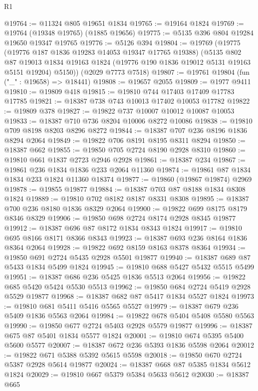 \begin{lexlean}{R1}
\begin{coremodule}
@19764 := @11324 @805 @19651 @1834
@19765 := @19164 @1824
@19769 := @19764 (@19348 @19765) (@1885 @19656)
@19775 := @5135 @396 @804 @19284 @19650 @19347 @19765
@19776 := @5126 @394
@19804 := @19769
    (@19775
      (@19776 @187 @1836 @19283 @14053 @19347 @17765 @19388)
      (@5135
        @802
        @87
        @19013
        @1834
        @19163
        @1824
        (@19776 @190 @1836 @19012 @5131 @19163 @5151 @19204)
        @5150))
    (@2029 @7773 @7518)
@19807 := @19761 @19804 (fun ("_" : @19658) => @18441)
@19808 := @19657 @2055
@19809 := @1977 @9411
@19810 := @19809 @418
@19815 := @19810 @744 @17403 @17409 @17783 @17785
@19821 := @18387 @738 @743 @10013 @17402 @10053 @17782
@19822 := @19809 @378
@19827 := @19822 @737 @10007 @10012 @10087 @10053
@19833 := @18387 @710 @736 @8204 @10006 @8272 @10086
@19838 := @19810 @709 @8198 @8203 @8296 @8272
@19844 := @18387 @707 @236 @8196 @1836 @8294 @2064
@19849 := @19822 @706 @8191 @8195 @8311 @8294
@19850 := @18387 @662
@19855 := @19850 @705 @2724 @8190 @2928 @8310
@19860 := @19810 @661 @1837 @2723 @2946 @2928
@19861 := @18387 @234
@19867 := @19861 @236 @1834 @1836 @233 @2064 @11360
@19874 := @19861 @87 @1834 @1834 @233 @1824 @11360 @18374
@19877 := @19860 (@19867 @19874) @2969
@19878 := @19855 @19877
@19884 := @18387 @703 @87 @8188 @1834 @8308 @1824
@19889 := @19810 @702 @8182 @8187 @8331 @8308
@19895 := @18387 @700 @236 @8180 @1836 @8329 @2064
@19900 := @19822 @699 @8175 @8179 @8346 @8329
@19906 := @19850 @698 @2724 @8174 @2928 @8345 @19877
@19912 := @18387 @696 @87 @8172 @1834 @8343 @1824
@19917 := @19810 @695 @8166 @8171 @8366 @8343
@19923 := @18387 @693 @236 @8164 @1836 @8364 @2064
@19928 := @19822 @692 @8159 @8163 @8378 @8364
@19934 := @19850 @691 @2724 @5435 @2928 @5501 @19877
@19940 := @18387 @689 @87 @5433 @1834 @5499 @1824
@19945 := @19810 @688 @5427 @5432 @5515 @5499
@19951 := @18387 @686 @236 @5425 @1836 @5513 @2064
@19956 := @19822 @685 @5420 @5424 @5530 @5513
@19962 := @19850 @684 @2724 @5419 @2928 @5529 @19877
@19968 := @18387 @682 @87 @5417 @1834 @5527 @1824
@19973 := @19810 @681 @5411 @5416 @5565 @5527
@19979 := @18387 @679 @236 @5409 @1836 @5563 @2064
@19984 := @19822 @678 @5404 @5408 @5580 @5563
@19990 := @19850 @677 @2724 @5403 @2928 @5579 @19877
@19996 := @18387 @675 @87 @5401 @1834 @5577 @1824
@20001 := @19810 @674 @5395 @5400 @5600 @5577
@20007 := @18387 @672 @236 @5393 @1836 @5598 @2064
@20012 := @19822 @671 @5388 @5392 @5615 @5598
@20018 := @19850 @670 @2724 @5387 @2928 @5614 @19877
@20024 := @18387 @668 @87 @5385 @1834 @5612 @1824
@20029 := @19810 @667 @5379 @5384 @5633 @5612
@20030 := @18387 @665

\end{coremodule}
\end{lexlean}
